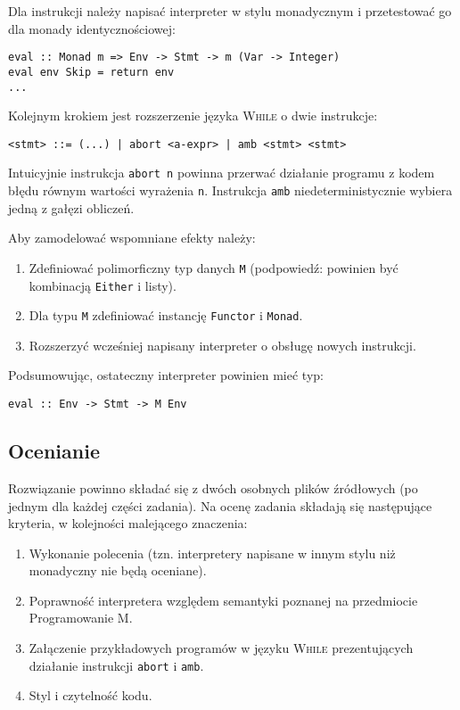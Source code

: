 \documentclass{article}[12pt]
\begin{document}
Dla instrukcji należy napisać interpreter w stylu monadycznym i przetestować
go dla monady identycznościowej:
\begin{verbatim}
eval :: Monad m => Env -> Stmt -> m (Var -> Integer)
eval env Skip = return env
...
\end{verbatim}

Kolejnym krokiem jest rozszerzenie języka \textsc{While} o dwie instrukcje:
\begin{verbatim}
<stmt> ::= (...) | abort <a-expr> | amb <stmt> <stmt>
\end{verbatim}

Intuicyjnie instrukcja \texttt{abort n} powinna przerwać działanie programu
z kodem błędu równym wartości wyrażenia \texttt{n}. Instrukcja \texttt{amb}
niedeterministycznie wybiera jedną z gałęzi obliczeń.

Aby zamodelować wspomniane efekty należy:
\begin{enumerate}
    \item Zdefiniować polimorficzny typ danych \texttt{M} (podpowiedź: powinien
        być kombinacją \texttt{Either} i listy).
    \item Dla typu \texttt{M} zdefiniować instancję \texttt{Functor} i \texttt{Monad}.
    \item Rozszerzyć wcześniej napisany interpreter o obsługę nowych instrukcji.
\end{enumerate}

Podsumowując, ostateczny interpreter powinien mieć typ:
\begin{verbatim}
eval :: Env -> Stmt -> M Env
\end{verbatim}

\subsection{Ocenianie}
Rozwiązanie powinno składać się z dwóch osobnych plików źródłowych (po jednym
dla każdej części zadania). Na ocenę zadania składają się następujące kryteria,
w kolejności malejącego znaczenia:
\begin{enumerate}
    \item Wykonanie polecenia (tzn. interpretery napisane w innym stylu niż
        monadyczny nie będą oceniane).
    \item Poprawność interpretera względem semantyki poznanej na przedmiocie
        Programowanie M.
    \item Załączenie przykładowych programów w języku \textsc{While} prezentujących
        działanie instrukcji \texttt{abort} i \texttt{amb}.
    \item Styl i czytelność kodu.
\end{enumerate}
\end{document}
